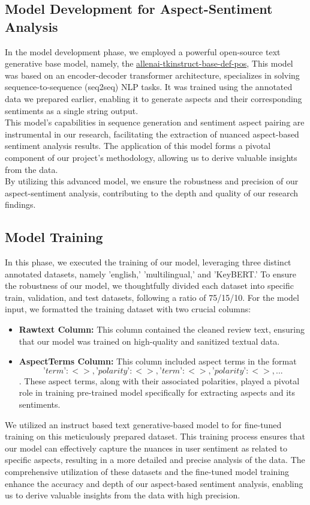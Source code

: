 \subsection{Model Development for Aspect-Sentiment Analysis}
In the model development phase, we employed a powerful open-source text generative base model, namely, the \href{https://huggingface.co/allenai/tkinstruct-base-def-pos}{allenai-tkinstruct-base-def-pos}, This model was based on an encoder-decoder transformer architecture, specializes in solving sequence-to-sequence (seq2seq) NLP tasks. It was trained using the annotated data we prepared earlier, enabling it to generate aspects and their corresponding sentiments as a single string output.
\\
This model's capabilities in sequence generation and sentiment aspect pairing are instrumental in our research, facilitating the extraction of nuanced aspect-based sentiment analysis results. The application of this model forms a pivotal component of our project's methodology, allowing us to derive valuable insights from the data.
\\
By utilizing this advanced model, we ensure the robustness and precision of our aspect-sentiment analysis, contributing to the depth and quality of our research findings.
\subsection{Model Training}
In this phase, we executed the training of our model, leveraging three distinct annotated datasets, namely 'english,' 'multilingual,' and 'KeyBERT.' To ensure the robustness of our model, we thoughtfully divided each dataset into specific train, validation, and test datasets, following a ratio of 75/15/10. For the model input, we formatted the training dataset with two crucial columns:
\begin{itemize}
    \item \textbf{Rawtext Column:} This column contained the cleaned review text, ensuring that our model was trained on high-quality and sanitized textual data.
    \item \textbf{AspectTerms Column:} This column included aspect terms in the format \[{’term’: <>, ’polarity’: <>}, {’term’: <>, ’polarity’: <>}, ...\]. These aspect terms, along with their associated polarities, played a pivotal role in training pre-trained model specifically for extracting aspects and its sentiments.
\end{itemize}
We utilized an instruct based text generative-based model to for fine-tuned training on this meticulously prepared dataset. This training process ensures that our model can effectively capture the nuances in user sentiment as related to specific aspects, resulting in a more detailed and precise analysis of the data. The comprehensive utilization of these datasets and the fine-tuned model training enhance the accuracy and depth of our aspect-based sentiment analysis, enabling us to derive valuable insights from the data with high precision.
